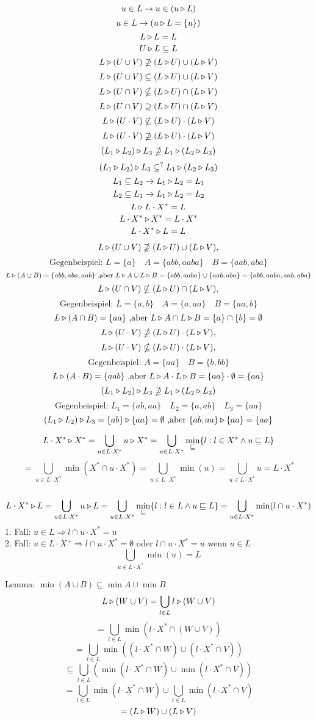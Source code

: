 $$u\in L \to u\in (u\triangleright L)$$
$$u\in L \to (u\triangleright L=\{u\})$$
$$L\triangleright L = L$$
$$U\triangleright L \subseteq L$$
$$L\triangleright (U\cup V)\nsupseteq (L\triangleright U) \cup (L\triangleright V)$$
$$L\triangleright (U\cup V)\subseteq (L\triangleright U) \cup (L\triangleright V)$$
$$L\triangleright (U\cap V)\nsubseteq (L\triangleright U) \cap (L\triangleright V)$$
$$L\triangleright (U\cap V)\supseteq (L\triangleright U) \cap (L\triangleright V)$$
$$L\triangleright (U\cdot V)\nsubseteq (L\triangleright U) \cdot (L\triangleright V)$$
$$L\triangleright (U\cdot V)\nsupseteq (L\triangleright U) \cdot (L\triangleright V)$$
$$(L_1 \triangleright L_2) \triangleright L_3 \nsupseteq L_1 \triangleright (L_2 \triangleright L_3)$$
$$(L_1 \triangleright L_2) \triangleright L_3 \subseteq^? L_1 \triangleright (L_2 \triangleright L_3)$$
$$L_1\subseteq L_2 \to L_1\triangleright L_2 = L_1$$
$$L_2\subseteq L_1 \to L_1\triangleright L_2 = L_2$$
$$L\triangleright L\cdot X^* = L$$
$$L\cdot X^*\triangleright X^* = L\cdot X^*$$
$$L\cdot X^*\triangleright L = L$$

\newpage
$$L\triangleright (U\cup V) \nsupseteq (L\triangleright U) \cup (L\triangleright V),$$
$$\text{Gegenbeispiel: } L=\{a\}\quad A=\{abb,aaba\}\quad B=\{aab,aba\} $$
$$L\triangleright (A\cup B) = \{abb,aba,aab\}\text{ ,aber } L\triangleright A \cup L\triangleright B =
\{abb,aaba\} \cup \{aab,aba\} = \{abb,aaba,aab,aba\} $$
\vspace{5mm}
$$L\triangleright (U\cap V)\nsubseteq (L\triangleright U) \cap (L\triangleright V),$$
$$\text{Gegenbeispiel: } L=\{a,b\}\quad A=\{a,aa\}\quad B=\{aa,b\} $$
$$L\triangleright (A\cap B) = \{aa\}\text{ ,aber } L\triangleright A \cap L\triangleright B =
\{a\} \cap \{b\} = \emptyset $$
\vspace{5mm}
$$L\triangleright (U\cdot V)\nsupseteq (L\triangleright U) \cdot (L\triangleright V),$$
$$L\triangleright (U\cdot V)\nsubseteq (L\triangleright U) \cdot (L\triangleright V),$$
$$\text{Gegenbeispiel: } A=\{aa\}\quad B=\{b,bb\} $$
$$L\triangleright (A\cdot B) = \{aab\}\text{ ,aber } L\triangleright A \cdot L\triangleright B =
\{aa\} \cdot \emptyset = \{aa\} $$
\vspace{5mm}
$$(L_1 \triangleright L_2) \triangleright L_3 \nsupseteq L_1 \triangleright (L_2 \triangleright L_3)$$
$$\text{Gegenbeispiel: } L_1=\{ab,aa\}\quad L_2=\{a,ab\}\quad L_3=\{aa\}$$
$$(L_1 \triangleright L_2) \triangleright L_3 = \{ab\} \triangleright \{aa\} = \emptyset\text{ ,aber } 
\{ab,aa\} \triangleright \{aa\} = \{aa\} $$
\vspace{5mm}

$$L\cdot X^* \triangleright X^* = \bigcup_{u\in L\cdot X^*} u\triangleright X^* = \bigcup_{u\in L\cdot X^*} \min_{\sqsubseteq} \{l:l\in X^*\wedge u\sqsubseteq L\}$$ 
$$= \bigcup_{u\in L\cdot X^*} \min(X^* \cap u\cdot X^*)=\bigcup_{u\in L\cdot X^*} \min(u) = \bigcup_{u\in L\cdot X^*} u = L\cdot X^*$$\\

$$L\cdot X^* \triangleright L = \bigcup_{u\in L\cdot X^*} u\triangleright L = \bigcup_{u\in L\cdot X^*} \min_{\sqsubseteq} \{l:l\in L \wedge u\sqsubseteq L\} = \bigcup_{u\in L\cdot X^*} \min(l\cap u\cdot X^*) $$
1. Fall: $u\in L \Rightarrow l\cap u\cdot X^* = u$\\
2. Fall: $u\in  L\cdot X^+ \Rightarrow l\cap u\cdot X^* = \emptyset$ oder $l\cap u\cdot X^* = u$ wenn $u\in L$\\
$$\bigcup_{u\in L\cdot X^*} \min(u) = L$$


\newpage
Lemma: $\min (A\cup B) \subseteq \min A \cup \min B$
$$L\triangleright (W\cup V)= \bigcup_{l\in L} l\triangleright (W\cup V)$$
$$=\bigcup_{l\in L} \min (l\cdot X^* \cap (W\cup V))$$
$$=\bigcup_{l\in L} \min ((l\cdot X^* \cap W) \cup (l\cdot X^* \cap V))$$
$$\subseteq \bigcup_{l\in L} (\min (l\cdot X^* \cap W) \cup \min (l\cdot X^* \cap V))$$
$$=\bigcup_{l\in L} \min (l\cdot X^*\cap W) \cup \bigcup_{l\in L} \min(l\cdot X^* \cap V)$$
$$=(L\triangleright W)\cup (L\triangleright V)$$